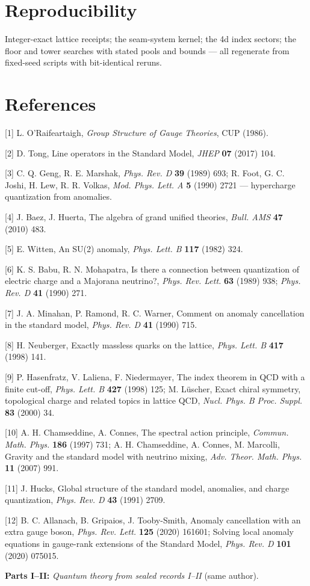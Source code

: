 \documentclass[11pt]{article}
\begin{document}
\section*{Reproducibility}
Integer-exact lattice receipts; the seam-system kernel; the 4d index sectors; the floor and tower searches with stated pools and bounds — all regenerate from fixed-seed scripts with bit-identical reruns.

\section*{References}
[1] L. O'Raifeartaigh, \emph{Group Structure of Gauge Theories}, CUP (1986).

[2] D. Tong, Line operators in the Standard Model, \emph{JHEP} \textbf{07} (2017) 104.

[3] C. Q. Geng, R. E. Marshak, \emph{Phys. Rev. D} \textbf{39} (1989) 693; R. Foot, G. C. Joshi, H. Lew, R. R. Volkas, \emph{Mod. Phys. Lett. A} \textbf{5} (1990) 2721 — hypercharge quantization from anomalies.

[4] J. Baez, J. Huerta, The algebra of grand unified theories, \emph{Bull. AMS} \textbf{47} (2010) 483.

[5] E. Witten, An SU(2) anomaly, \emph{Phys. Lett. B} \textbf{117} (1982) 324.

[6] K. S. Babu, R. N. Mohapatra, Is there a connection between quantization of electric charge and a Majorana neutrino?, \emph{Phys. Rev. Lett.} \textbf{63} (1989) 938; \emph{Phys. Rev. D} \textbf{41} (1990) 271.

[7] J. A. Minahan, P. Ramond, R. C. Warner, Comment on anomaly cancellation in the standard model, \emph{Phys. Rev. D} \textbf{41} (1990) 715.

[8] H. Neuberger, Exactly massless quarks on the lattice, \emph{Phys. Lett. B} \textbf{417} (1998) 141.

[9] P. Hasenfratz, V. Laliena, F. Niedermayer, The index theorem in QCD with a finite cut-off, \emph{Phys. Lett. B} \textbf{427} (1998) 125; M. Lüscher, Exact chiral symmetry, topological charge and related topics in lattice QCD, \emph{Nucl. Phys. B Proc. Suppl.} \textbf{83} (2000) 34.

[10] A. H. Chamseddine, A. Connes, The spectral action principle, \emph{Commun. Math. Phys.} \textbf{186} (1997) 731; A. H. Chamseddine, A. Connes, M. Marcolli, Gravity and the standard model with neutrino mixing, \emph{Adv. Theor. Math. Phys.} \textbf{11} (2007) 991.

[11] J. Hucks, Global structure of the standard model, anomalies, and charge quantization, \emph{Phys. Rev. D} \textbf{43} (1991) 2709.

[12] B. C. Allanach, B. Gripaios, J. Tooby-Smith, Anomaly cancellation with an extra gauge boson, \emph{Phys. Rev. Lett.} \textbf{125} (2020) 161601; Solving local anomaly equations in gauge-rank extensions of the Standard Model, \emph{Phys. Rev. D} \textbf{101} (2020) 075015.

\textbf{Parts I–II:} \emph{Quantum theory from sealed records I–II} (same author).
\end{document}
